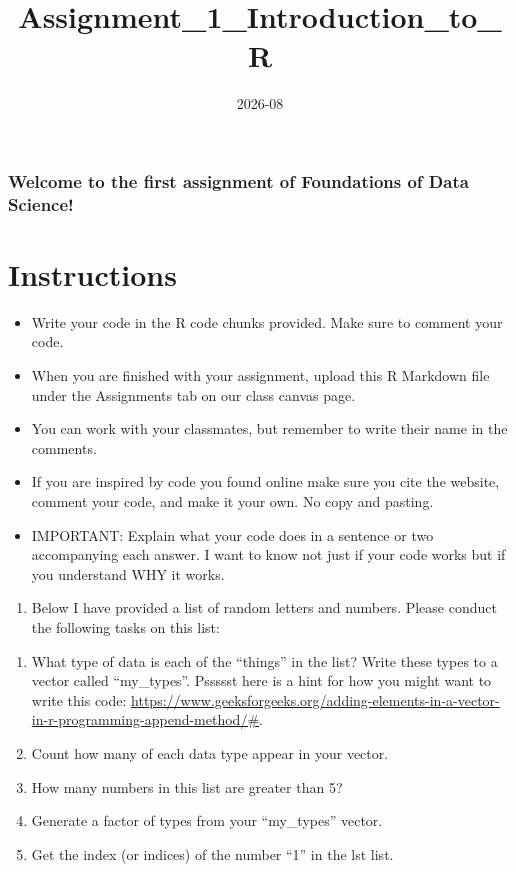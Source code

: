 \documentclass[
]{article}
\title{Assignment\_1\_Introduction\_to\_R}
\author{}
\date{\vspace{-2.5em}2026-08}
\providecommand{\tightlist}{%
  \setlength{\itemsep}{0pt}\setlength{\parskip}{0pt}}
\begin{document}
\maketitle

\subsubsection{Welcome to the first assignment of Foundations of Data
Science!}\label{welcome-to-the-first-assignment-of-foundations-of-data-science}

\section{Instructions}\label{instructions}

\begin{itemize}
\tightlist
\item
  Write your code in the R code chunks provided. Make sure to comment
  your code.
\item
  When you are finished with your assignment, upload this R Markdown
  file under the Assignments tab on our class canvas page.
\item
  You can work with your classmates, but remember to write their name in
  the comments.
\item
  If you are inspired by code you found online make sure you cite the
  website, comment your code, and make it your own. No copy and pasting.
\item
  IMPORTANT: Explain what your code does in a sentence or two
  accompanying each answer. I want to know not just if your code works
  but if you understand WHY it works.
\end{itemize}

\begin{enumerate}
\def\labelenumi{\arabic{enumi})}
\tightlist
\item
  Below I have provided a list of random letters and numbers. Please
  conduct the following tasks on this list:
\end{enumerate}

\begin{enumerate}
\def\labelenumi{\alph{enumi})}
\tightlist
\item
  What type of data is each of the ``things'' in the list? Write these
  types to a vector called ``my\_types''. Pssssst here is a hint for how
  you might want to write this code:
  \url{https://www.geeksforgeeks.org/adding-elements-in-a-vector-in-r-programming-append-method/\#}.
\item
  Count how many of each data type appear in your vector.
\item
  How many numbers in this list are greater than 5?
\item
  Generate a factor of types from your ``my\_types'' vector.
\item
  Get the index (or indices) of the number ``1'' in the lst list.
\end{enumerate}
\end{document}
